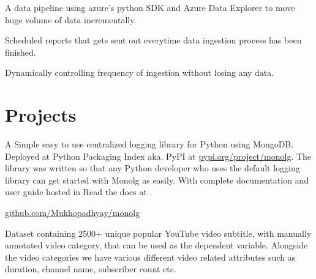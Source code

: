 \documentclass[]{deedy-resume-openfont}
\begin{document}

 \textbullet{}  \textbullet{} 

\begin{tightemize}
\item A data pipeline using azure's python SDK and Azure Data Explorer to move huge volume of data incrementally.
\item Scheduled reports that gets sent out everytime data ingestion process has been finished.
\item Dynamically controlling frequency of ingestion without losing any data.
\end{tightemize}

\sectionsep


\section{Projects}

A Simple easy to use centralized logging library for Python using MongoDB. Deployed at Python Packaging Index aka. PyPI at \href{https://pypi.org/project/monolg/}{pypi.org/project/monolg}. The library was written so that any Python developer who uses the default logging library can get started with Monolg as easily. With complete documentation and user guide hosted in Read the docs at \href{https://monolg.readthedocs.io/en/latest/}{}.

\href{https://github.com/Mukhopadhyay/monolg}{ github.com/Mukhopadhyay/monolg}

\sectionsep


Dataset containing 2500+ unique popular YouTube video subtitle, with manually annotated video category, that can be used as the dependent variable. Alongside the video categories we have various different video related attributes such as duration, channel name, subscriber count etc.

\href{https://www.kaggle.com/datasets/praneshmukhopadhyay/youtubers-saying-things}{ }
\end{document}
